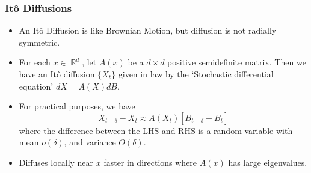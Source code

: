 \documentclass[usenames,dvipsnames,12pt]{beamer}
\DeclareMathOperator{\RR}{\mathbb{R}}
\begin{document}
\begin{frame}
    \frametitle{It\^{o} Diffusions}

    \begin{itemize}
        \item An It\^{o} Diffusion is like Brownian Motion, but diffusion is not radially symmetric.

        \pause
        \item For each $x \in \RR^d$, let $A(x)$ be a $d \times d$ positive semidefinite matrix. Then we have an It\^{o} diffusion $\{ X_t \}$ given in law by the `Stochastic differential equation' $dX = A(X) dB$.

        \pause
        \item For practical purposes, we have
        \[ X_{t + \delta} - X_t \approx A(X_t) [B_{t + \delta} - B_t] \]
        where the difference between the LHS and RHS is a random variable with mean $o(\delta)$, and variance $O(\delta)$. %

        \pause
        \item Diffuses locally near $x$ faster in directions where $A(x)$ has large eigenvalues.
    \end{itemize}

\end{frame}
\end{document}
